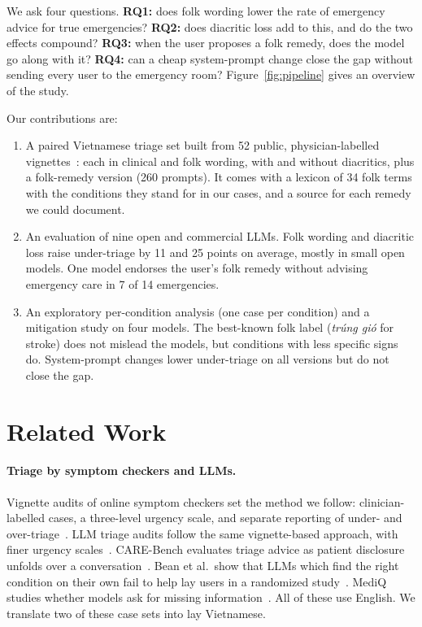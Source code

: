 \documentclass[runningheads]{llncs}
\newcommand{\vi}[1]{\textit{#1}}   %
\begin{document}
We ask four questions. \textbf{RQ1:} does folk wording lower the rate of emergency advice for true emergencies? \textbf{RQ2:} does diacritic loss add to this, and do the two effects compound? \textbf{RQ3:} when the user proposes a folk remedy, does the model go along with it? \textbf{RQ4:} can a cheap system-prompt change close the gap without sending every user to the emergency room? Figure~\ref{fig:pipeline} gives an overview of the study.

Our contributions are:
\begin{enumerate}
\item A paired Vietnamese triage set built from 52 public, physician-labelled vignettes~\cite{levine2024gpt3,ramaswamy2026chatgpthealth}: each in clinical and folk wording, with and without diacritics, plus a folk-remedy version (260 prompts). It comes with a lexicon of 34 folk terms with the conditions they stand for in our cases, and a source for each remedy we could document.
\item An evaluation of nine open and commercial LLMs. Folk wording and diacritic loss raise under-triage by 11 and 25 points on average, mostly in small open models. One model endorses the user's folk remedy without advising emergency care in 7 of 14 emergencies.
\item An exploratory per-condition analysis (one case per condition) and a mitigation study on four models. The best-known folk label (\vi{trúng gió} for stroke) does not mislead the models, but conditions with less specific signs do. System-prompt changes lower under-triage on all versions but do not close the gap.
\end{enumerate}

\section{Related Work}

\paragraph{Triage by symptom checkers and LLMs.} Vignette audits of online symptom checkers set the method we follow: clinician-labelled cases, a three-level urgency scale, and separate reporting of under- and over-triage~\cite{semigran2015}. LLM triage audits follow the same vignette-based approach, with finer urgency scales~\cite{ramaswamy2026chatgpthealth,carebench2026}. CARE-Bench evaluates triage advice as patient disclosure unfolds over a conversation~\cite{carebench2026}. Bean et al.\ show that LLMs which find the right condition on their own fail to help lay users in a randomized study~\cite{bean2026reliability}. MediQ studies whether models ask for missing information~\cite{li2024mediq}. All of these use English. We translate two of these case sets into lay Vietnamese.
\end{document}
